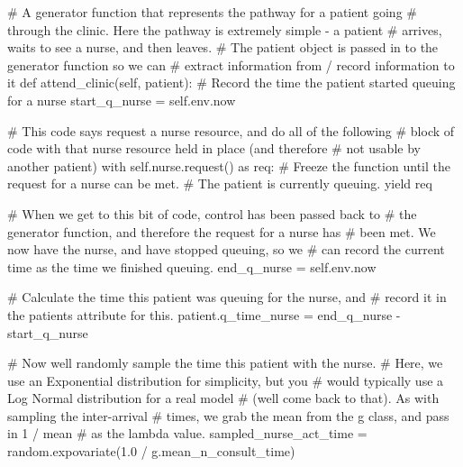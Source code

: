 \documentclass[
  letterpaper,
  DIV=11,
  numbers=noendperiod]{scrreprt}
\newenvironment{Shaded}{}{}
\newcommand{\CommentTok}[1]{\textcolor[rgb]{0.42,0.45,0.49}{#1}}
\newcommand{\ControlFlowTok}[1]{\textcolor[rgb]{0.84,0.23,0.29}{#1}}
\newcommand{\FloatTok}[1]{\textcolor[rgb]{0.00,0.36,0.77}{#1}}
\newcommand{\ImportTok}[1]{\textcolor[rgb]{0.01,0.18,0.38}{#1}}
\newcommand{\KeywordTok}[1]{\textcolor[rgb]{0.84,0.23,0.29}{#1}}
\newcommand{\NormalTok}[1]{\textcolor[rgb]{0.14,0.16,0.18}{#1}}
\newcommand{\OperatorTok}[1]{\textcolor[rgb]{0.14,0.16,0.18}{#1}}
\newcommand{\VariableTok}[1]{\textcolor[rgb]{0.89,0.38,0.04}{#1}}
\begin{document}
\begin{tcolorbox}
\begin{Shaded}
\begin{Highlighting}[]
    \CommentTok{\# A generator function that represents the pathway for a patient going}
    \CommentTok{\# through the clinic.  Here the pathway is extremely simple {-} a patient}
    \CommentTok{\# arrives, waits to see a nurse, and then leaves.}
    \CommentTok{\# The patient object is passed in to the generator function so we can}
    \CommentTok{\# extract information from / record information to it}
    \KeywordTok{def}\NormalTok{ attend\_clinic(}\VariableTok{self}\NormalTok{, patient):}
        \CommentTok{\# Record the time the patient started queuing for a nurse}
\NormalTok{        start\_q\_nurse }\OperatorTok{=} \VariableTok{self}\NormalTok{.env.now}

        \CommentTok{\# This code says request a nurse resource, and do all of the following}
        \CommentTok{\# block of code with that nurse resource held in place (and therefore}
        \CommentTok{\# not usable by another patient)}
        \ControlFlowTok{with} \VariableTok{self}\NormalTok{.nurse.request() }\ImportTok{as}\NormalTok{ req:}
            \CommentTok{\# Freeze the function until the request for a nurse can be met.}
            \CommentTok{\# The patient is currently queuing.}
            \ControlFlowTok{yield}\NormalTok{ req}

            \CommentTok{\# When we get to this bit of code, control has been passed back to}
            \CommentTok{\# the generator function, and therefore the request for a nurse has}
            \CommentTok{\# been met.  We now have the nurse, and have stopped queuing, so we}
            \CommentTok{\# can record the current time as the time we finished queuing.}
\NormalTok{            end\_q\_nurse }\OperatorTok{=} \VariableTok{self}\NormalTok{.env.now}

            \CommentTok{\# Calculate the time this patient was queuing for the nurse, and}
            \CommentTok{\# record it in the patient\textquotesingle{}s attribute for this.}
\NormalTok{            patient.q\_time\_nurse }\OperatorTok{=}\NormalTok{ end\_q\_nurse }\OperatorTok{{-}}\NormalTok{ start\_q\_nurse}

            \CommentTok{\# Now we\textquotesingle{}ll randomly sample the time this patient with the nurse.}
            \CommentTok{\# Here, we use an Exponential distribution for simplicity, but you}
            \CommentTok{\# would typically use a Log Normal distribution for a real model}
            \CommentTok{\# (we\textquotesingle{}ll come back to that).  As with sampling the inter{-}arrival}
            \CommentTok{\# times, we grab the mean from the g class, and pass in 1 / mean}
            \CommentTok{\# as the lambda value.}
\NormalTok{            sampled\_nurse\_act\_time }\OperatorTok{=}\NormalTok{ random.expovariate(}\FloatTok{1.0} \OperatorTok{/}
\NormalTok{                                                        g.mean\_n\_consult\_time)}


\end{Highlighting}
\end{Shaded}
\end{tcolorbox}
\end{document}
